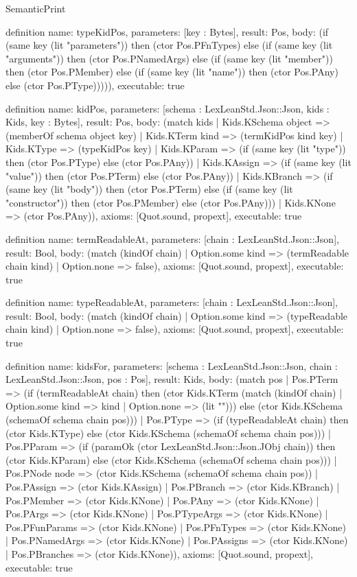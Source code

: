 \begin{lexlean}{SemanticPrint}
\begin{semanticmodule}
definition{
  name: typeKidPos,
  parameters: [key : Bytes],
  result: Pos,
  body: (if (same key (lit "parameters")) then (ctor Pos.PFnTypes) else (if (same key (lit "arguments")) then (ctor Pos.PNamedArgs) else (if (same key (lit "member")) then (ctor Pos.PMember) else (if (same key (lit "name")) then (ctor Pos.PAny) else (ctor Pos.PType))))),
  executable: true
}

definition{
  name: kidPos,
  parameters: [schema : LexLeanStd.Json::Json, kids : Kids, key : Bytes],
  result: Pos,
  body: (match kids
    | Kids.KSchema object => (memberOf schema object key)
    | Kids.KTerm kind => (termKidPos kind key)
    | Kids.KType => (typeKidPos key)
    | Kids.KParam => (if (same key (lit "type")) then (ctor Pos.PType) else (ctor Pos.PAny))
    | Kids.KAssign => (if (same key (lit "value")) then (ctor Pos.PTerm) else (ctor Pos.PAny))
    | Kids.KBranch => (if (same key (lit "body")) then (ctor Pos.PTerm) else (if (same key (lit "constructor")) then (ctor Pos.PMember) else (ctor Pos.PAny)))
    | Kids.KNone => (ctor Pos.PAny)),
  axioms: [Quot.sound, propext],
  executable: true
}

definition{
  name: termReadableAt,
  parameters: [chain : LexLeanStd.Json::Json],
  result: Bool,
  body: (match (kindOf chain)
    | Option.some kind => (termReadable chain kind)
    | Option.none => false),
  axioms: [Quot.sound, propext],
  executable: true
}

definition{
  name: typeReadableAt,
  parameters: [chain : LexLeanStd.Json::Json],
  result: Bool,
  body: (match (kindOf chain)
    | Option.some kind => (typeReadable chain kind)
    | Option.none => false),
  axioms: [Quot.sound, propext],
  executable: true
}

definition{
  name: kidsFor,
  parameters: [schema : LexLeanStd.Json::Json, chain : LexLeanStd.Json::Json, pos : Pos],
  result: Kids,
  body: (match pos
    | Pos.PTerm => (if (termReadableAt chain) then (ctor Kids.KTerm (match (kindOf chain)
      | Option.some kind => kind
      | Option.none => (lit ""))) else (ctor Kids.KSchema (schemaOf schema chain pos)))
    | Pos.PType => (if (typeReadableAt chain) then (ctor Kids.KType) else (ctor Kids.KSchema (schemaOf schema chain pos)))
    | Pos.PParam => (if (paramOk (ctor LexLeanStd.Json::Json.JObj chain)) then (ctor Kids.KParam) else (ctor Kids.KSchema (schemaOf schema chain pos)))
    | Pos.PNode node => (ctor Kids.KSchema (schemaOf schema chain pos))
    | Pos.PAssign => (ctor Kids.KAssign)
    | Pos.PBranch => (ctor Kids.KBranch)
    | Pos.PMember => (ctor Kids.KNone)
    | Pos.PAny => (ctor Kids.KNone)
    | Pos.PArgs => (ctor Kids.KNone)
    | Pos.PTypeArgs => (ctor Kids.KNone)
    | Pos.PFunParams => (ctor Kids.KNone)
    | Pos.PFnTypes => (ctor Kids.KNone)
    | Pos.PNamedArgs => (ctor Kids.KNone)
    | Pos.PAssigns => (ctor Kids.KNone)
    | Pos.PBranches => (ctor Kids.KNone)),
  axioms: [Quot.sound, propext],
  executable: true
}


\end{semanticmodule}
\end{lexlean}
